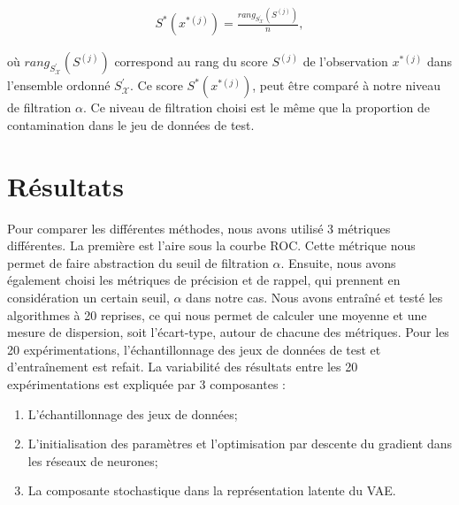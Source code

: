 \begin{gather}
	S^*(x^{*(j)}) = \frac{rang_{S^{'}_{\mathcal{X}}}(S^{(j)})}{n},
\end{gather}

où $rang_{S^{'}_{\mathcal{X}}}(S^{(j)})$ correspond au rang du score $S^{(j)}$ de l'observation $x^{*(j)}$ dans l'ensemble ordonné $S^{'}_{\mathcal{X}}$. Ce score $S^*(x^{*(j)})$, peut être comparé à notre niveau de filtration $\alpha$. Ce niveau de filtration choisi est le même que la proportion de contamination dans le jeu de données de test.

\section{Résultats}

Pour comparer les différentes méthodes, nous avons utilisé 3 métriques différentes. La première est l'aire sous la courbe ROC. Cette métrique nous permet de faire abstraction du seuil de filtration $\alpha$. Ensuite, nous avons également choisi les métriques de précision et de rappel, qui prennent en considération un certain seuil, $\alpha$ dans notre cas. Nous avons entraîné et testé les algorithmes à 20 reprises, ce qui nous permet de calculer une moyenne et une mesure de dispersion, soit l'écart-type, autour de chacune des métriques. Pour les 20 expérimentations, l'échantillonnage des jeux de données de test et d'entraînement est refait. La variabilité des résultats entre les 20 expérimentations est expliquée par 3 composantes :

\begin{enumerate}
	\item L'échantillonnage des jeux de données;
	\item L'initialisation des paramètres et l'optimisation par descente du gradient dans les réseaux de neurones;
	\item La composante stochastique dans la représentation latente du VAE.
\end{enumerate}

